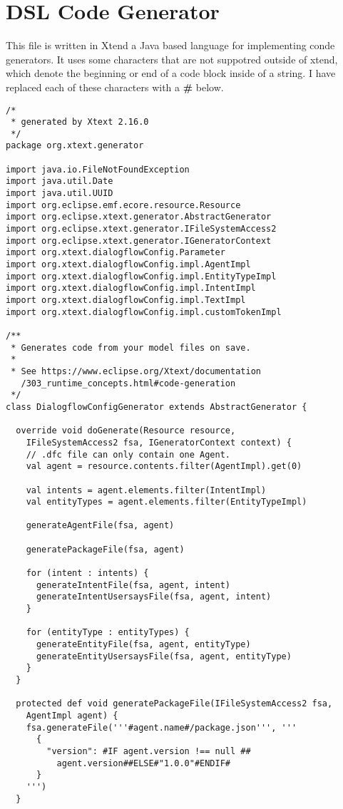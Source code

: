 \chapter{DSL Code Generator}

This file is written in Xtend a Java based language for implementing conde generators. It uses some characters that are not suppotred outside of xtend, which denote the beginning or end of a code block inside of a string. I have replaced each of these characters with a \textbf{\#} below.

\begin{lstlisting}
/*
 * generated by Xtext 2.16.0
 */
package org.xtext.generator

import java.io.FileNotFoundException
import java.util.Date
import java.util.UUID
import org.eclipse.emf.ecore.resource.Resource
import org.eclipse.xtext.generator.AbstractGenerator
import org.eclipse.xtext.generator.IFileSystemAccess2
import org.eclipse.xtext.generator.IGeneratorContext
import org.xtext.dialogflowConfig.Parameter
import org.xtext.dialogflowConfig.impl.AgentImpl
import org.xtext.dialogflowConfig.impl.EntityTypeImpl
import org.xtext.dialogflowConfig.impl.IntentImpl
import org.xtext.dialogflowConfig.impl.TextImpl
import org.xtext.dialogflowConfig.impl.customTokenImpl

/**
 * Generates code from your model files on save.
 * 
 * See https://www.eclipse.org/Xtext/documentation
   /303_runtime_concepts.html#code-generation
 */
class DialogflowConfigGenerator extends AbstractGenerator {

  override void doGenerate(Resource resource, 
    IFileSystemAccess2 fsa, IGeneratorContext context) {
    // .dfc file can only contain one Agent.
    val agent = resource.contents.filter(AgentImpl).get(0)

    val intents = agent.elements.filter(IntentImpl)
    val entityTypes = agent.elements.filter(EntityTypeImpl)

    generateAgentFile(fsa, agent)

    generatePackageFile(fsa, agent)

    for (intent : intents) {
      generateIntentFile(fsa, agent, intent)
      generateIntentUsersaysFile(fsa, agent, intent)
    }

    for (entityType : entityTypes) {
      generateEntityFile(fsa, agent, entityType)
      generateEntityUsersaysFile(fsa, agent, entityType)
    }
  }

  protected def void generatePackageFile(IFileSystemAccess2 fsa, 
    AgentImpl agent) {
    fsa.generateFile('''#agent.name#/package.json''', '''
      {
        "version": #IF agent.version !== null ##
          agent.version##ELSE#"1.0.0"#ENDIF#
      }
    ''')
  }


\end{lstlisting}
